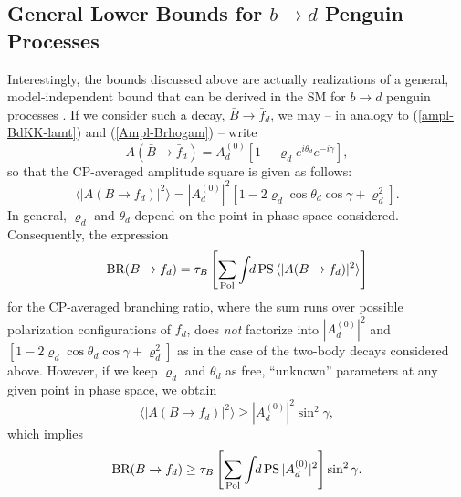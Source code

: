 \documentclass[11pt]{cernrep}
\begin{document}
\subsection{General Lower Bounds for $b\to d$ Penguin Processes}
\unboldmath
%
%
%
Interestingly, the bounds discussed above are actually 
realizations of a general, model-independent bound that can be derived
in the SM for $b\to d$ penguin processes \cite{FR2}. If we consider such
a decay, $\bar B \to \bar f_d$, we may -- in analogy to (\ref{ampl-BdKK-lamt}) 
and (\ref{Ampl-Brhogam}) -- write
\begin{equation}
A(\bar B \to \bar f_d)= A^{(0)}_d
\left[1-\varrho_de^{i\theta_d}e^{-i\gamma}\right],
\end{equation}
so that the CP-averaged amplitude square is given as follows:
\begin{equation}
\langle|A(B \to f_d)|^2\rangle=|A^{(0)}_d|^2
\left[1-2\varrho_d\cos\theta_d\cos\gamma+\varrho_d^2\right].
\end{equation}
In general, $\varrho_d$ and $\theta_d$ depend on the point in phase space
considered. Consequently, the expression
\begin{equation}
\mbox{BR}(B \to f_d)=\tau_B\left[\sum_{\rm Pol}
\int \!\! d \, {\rm PS} \, \langle|A(B \to f_d)|^2\rangle \right]
\end{equation}
for the CP-averaged branching ratio, where the sum runs over possible
polarization configurations of $f_d$, does {\it not} factorize into 
$|A^{(0)}_d|^2$ and $[1-2\varrho_d\cos\theta_d\cos\gamma+\varrho_d^2]$ as 
in the case of the two-body decays considered above. However, if we 
keep $\varrho_d$ and $\theta_d$ as free, ``unknown'' parameters at any 
given point in phase space, we obtain
\begin{equation}
\langle|A(B \to f_d)|^2\rangle\geq|A^{(0)}_d|^2 \sin^2\gamma,
\end{equation}
which implies
\begin{equation}
\mbox{BR}(B \to f_d)\geq\tau_B\left[\sum_{\rm Pol}
\int \!\! d \, {\rm PS} \, |A^{(0)}_d|^2 \right]\sin^2\gamma.
\end{equation}
\end{document}
